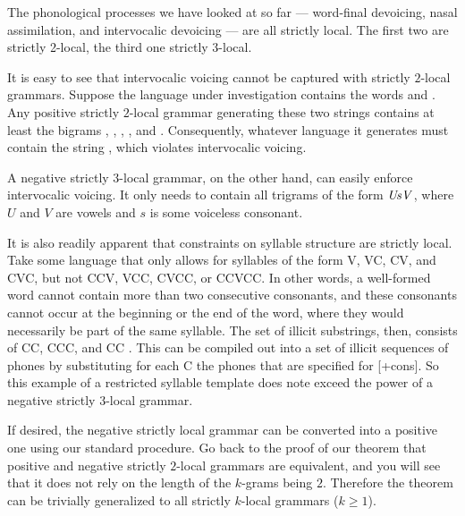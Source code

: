 The phonological processes we have looked at so far --- word-final devoicing, nasal assimilation, and intervocalic devoicing --- are all strictly local.
The first two are strictly 2-local, the third one strictly 3-local.
%
\begin{examplebox}
    It is easy to see that intervocalic voicing cannot be captured with strictly $2$-local grammars.
    Suppose the language under investigation contains the words  and .
    Any positive strictly $2$-local grammar generating these two strings contains at least the bigrams \LeftEdge{}, , , , and .
    Consequently, whatever language it generates must contain the string , which violates intervocalic voicing.

    A negative strictly $3$-local grammar, on the other hand, can easily enforce intervocalic voicing.
    It only needs to contain all trigrams of the form $\mathit{UsV}$, where $U$ and $V$ are vowels and $s$ is some voiceless consonant.
\end{examplebox}
%
It is also readily apparent that constraints on syllable structure are strictly local.
Take some language that only allows for syllables of the form V, VC, CV, and CVC, but not CCV, VCC, CVCC, or CCVCC\@.
In other words, a well-formed word cannot contain more than two consecutive consonants, and these consonants cannot occur at the beginning or the end of the word, where they would necessarily be part of the same syllable.
The set of illicit substrings, then, consists of \LeftEdge CC, CCC, and CC \RightEdge.
This can be compiled out into a set of illicit sequences of phones by substituting for each C the phones that are specified for [+cons].
So this example of a restricted syllable template does note exceed the power of a negative strictly $3$-local grammar.

If desired, the negative strictly local grammar can be converted into a positive one using our standard procedure.
Go back to the proof of our theorem that positive and negative strictly $2$-local grammars are equivalent, and you will see that it does not rely on the length of the $k$-grams being $2$.
Therefore the theorem can be trivially generalized to all strictly $k$-local grammars ($k \geq 1$).

